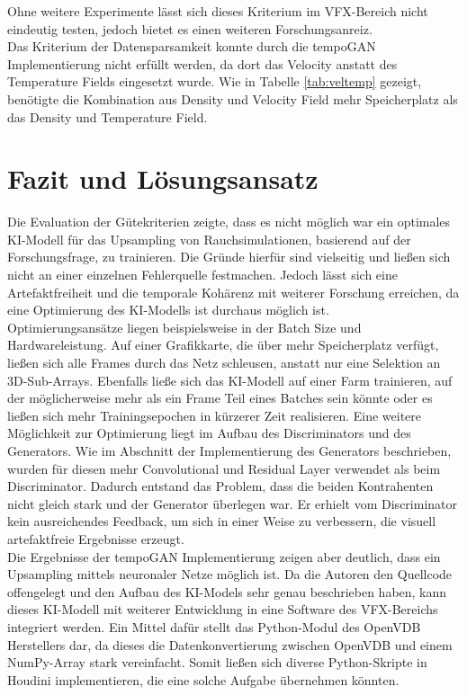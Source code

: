 Ohne weitere Experimente lässt sich dieses Kriterium im VFX-Bereich nicht eindeutig testen, jedoch bietet es einen weiteren Forschungsanreiz.\\

Das Kriterium der Datensparsamkeit konnte durch die tempoGAN Implementierung nicht erfüllt werden, da dort das Velocity anstatt des Temperature Fields eingesetzt wurde. Wie in Tabelle \ref{tab:veltemp} gezeigt, benötigte die Kombination aus Density und Velocity Field mehr Speicherplatz als das Density und Temperature Field.

\section{Fazit und Lösungsansatz}
Die Evaluation der Gütekriterien zeigte, dass es nicht möglich war ein optimales KI-Modell für das Upsampling von Rauchsimulationen, basierend auf der Forschungsfrage, zu trainieren. Die Gründe hierfür sind vielseitig und ließen sich nicht an einer einzelnen Fehlerquelle festmachen. Jedoch lässt sich eine Artefaktfreiheit und die temporale Kohärenz mit weiterer Forschung erreichen, da eine Optimierung des KI-Modells ist durchaus möglich ist. \\

Optimierungsansätze liegen beispielsweise in der Batch Size und Hardwareleistung. Auf einer Grafikkarte, die über mehr Speicherplatz verfügt, ließen sich alle Frames durch das Netz schleusen, anstatt nur eine Selektion an 3D-Sub-Arrays. Ebenfalls ließe sich das KI-Modell auf einer Farm trainieren, auf der möglicherweise mehr als ein Frame Teil eines Batches sein könnte oder es ließen sich mehr Trainingsepochen in kürzerer Zeit realisieren. Eine weitere Möglichkeit zur Optimierung liegt im Aufbau des Discriminators und des Generators. Wie im Abschnitt der Implementierung des Generators beschrieben, wurden für diesen mehr Convolutional und Residual Layer verwendet als beim Discriminator. Dadurch entstand das Problem, dass die beiden Kontrahenten nicht gleich stark und der Generator überlegen war. Er erhielt vom Discriminator kein ausreichendes Feedback, um sich in einer Weise zu verbessern, die visuell artefaktfreie Ergebnisse erzeugt.\\

Die Ergebnisse der tempoGAN Implementierung zeigen aber deutlich, dass ein Upsampling mittels neuronaler Netze möglich ist. Da die Autoren den Quellcode offengelegt und den Aufbau des KI-Models sehr genau beschrieben haben, kann dieses KI-Modell mit weiterer Entwicklung in eine Software des VFX-Bereichs integriert werden. Ein Mittel dafür stellt das Python-Modul des OpenVDB Herstellers dar, da dieses die Datenkonvertierung zwischen OpenVDB und einem NumPy-Array stark vereinfacht. Somit ließen sich diverse Python-Skripte in Houdini implementieren, die eine solche Aufgabe übernehmen könnten.